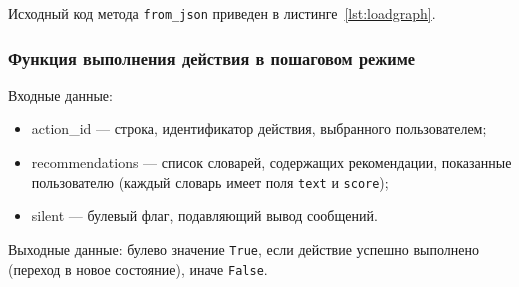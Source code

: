 Исходный код метода \texttt{from\_json} приведен в листинге~\ref{lst:loadgraph}.



\subsubsection{Функция выполнения действия в пошаговом режиме}

Входные данные:
\begin{itemize}
    \item action\_id --- строка, идентификатор действия, выбранного пользователем;
    \item recommendations --- список словарей, содержащих рекомендации, показанные пользователю (каждый словарь имеет поля \texttt{text} и \texttt{score});
    \item silent --- булевый флаг, подавляющий вывод сообщений.
\end{itemize}

Выходные данные: булево значение \texttt{True}, если действие успешно выполнено (переход в новое состояние), иначе \texttt{False}.


